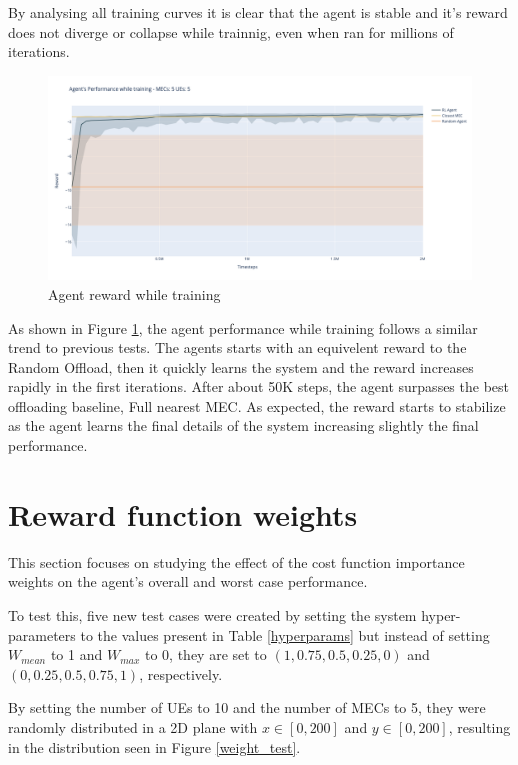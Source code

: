 By analysing all training curves it is clear that the agent is stable and it's reward does not diverge or collapse while trainnig, even when ran for millions of iterations.

\begin{figure}[H]
  \centering
  \includegraphics[width=\textwidth]{images/5_5_training.png}
  \caption{Agent reward while training}  \label{hetero_training}
\end{figure}

As shown in Figure \ref{hetero_training}, the agent performance while training follows a similar trend to previous tests. The agents starts with an equivelent reward to the Random Offload, then it quickly learns the system and the reward increases rapidly in the first iterations. After about 50K steps, the agent surpasses the best offloading baseline, Full nearest MEC. As expected, the reward starts to stabilize as the agent learns the final details of the system increasing slightly the final performance.

\section{Reward function weights}

This section focuses on studying the effect of the cost function importance weights on the agent's overall and worst case performance.

To test this, five new test cases were created by setting the system hyper-parameters to the values present in Table \ref{hyperparams} but instead of setting $W_{mean}$ to 1 and $W_{max}$ to 0, they are set to $(1, 0.75, 0.5, 0.25, 0)$ and $(0, 0.25, 0.5, 0.75, 1)$, respectively.

By setting the number of \acrshort{UE}s to 10 and the number of \acrshort{MEC}s to 5, they were randomly distributed in a 2D plane with $x \in [0, 200]$ and $y \in [0, 200]$, resulting in the distribution seen in Figure \ref{weight_test}.

